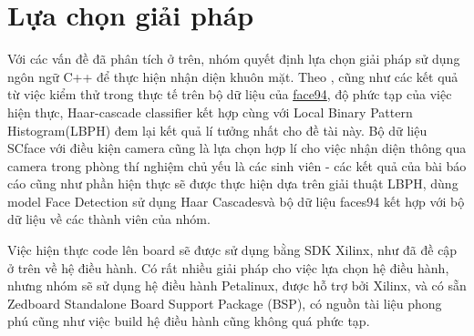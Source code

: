 \documentclass[a4paper]{report}
\begin{document}
\section{Lựa chọn giải pháp}
Với các vấn đề đã phân tích ở trên, nhóm quyết định lựa chọn giải pháp sử dụng ngôn ngữ C++ để thực hiện nhận diện khuôn mặt. Theo \cite{sosanh}, cũng như các kết quả  từ việc kiểm thử trong thực tế trên bộ dữ liệu của \href{https://cswww.essex.ac.uk/mv/allfaces/faces94.html}{face94}, độ phức tạp của việc hiện thực, Haar-cascade classifier kết hợp cùng với Local Binary Pattern Histogram(LBPH) đem lại kết quả lí tưởng nhất cho đề tài này. Bộ dữ liệu SCface với điều kiện camera cũng là lựa chọn hợp lí cho việc nhận diện thông qua camera trong phòng thí nghiệm chủ yếu là các sinh viên - các kết quả của bài báo cáo cũng như phần hiện thực sẽ được thực hiện dựa trên giải thuật LBPH, dùng model Face Detection sử dụng Haar Cascadesvà bộ dữ liệu faces94 kết hợp với bộ dữ liệu về các thành viên của nhóm.
\par\noindent
Việc hiện thực code lên board sẽ được sử dụng bằng SDK Xilinx, như đã đề cập ở trên về hệ điều hành. Có rất nhiều giải pháp cho việc lựa chọn hệ điều hành, nhưng nhóm sẽ sử dụng hệ điều hành Petalinux, được hỗ trợ bởi Xilinx\cite{peta}, và có sẵn Zedboard Standalone Board Support Package (BSP), có nguồn tài liệu phong phú cũng như việc build hệ điều hành cũng không quá phức tạp.
\end{document}

